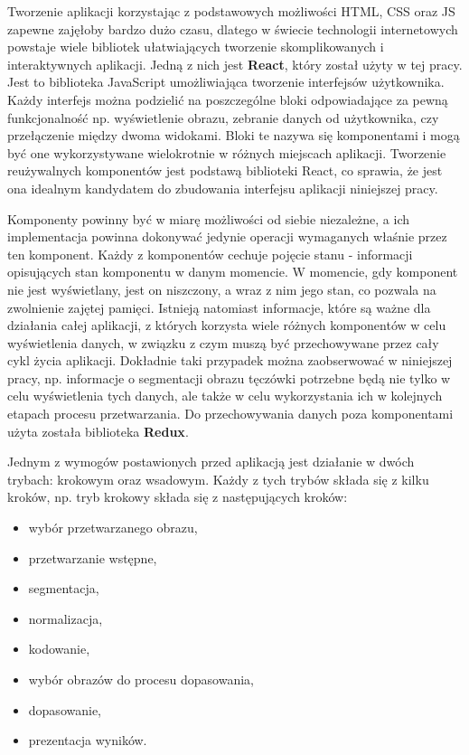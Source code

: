 \documentclass[10pt,polish,a4paper,oneside]{ppfcmthesis}
\begin{document}
Tworzenie aplikacji korzystając z podstawowych możliwości HTML, CSS oraz JS zapewne zajęłoby
bardzo dużo czasu, dlatego w świecie technologii internetowych powstaje wiele bibliotek
ułatwiających tworzenie skomplikowanych i interaktywnych aplikacji. Jedną z nich jest
\textbf{React}, który został użyty w tej pracy. Jest to biblioteka JavaScript umożliwiająca
tworzenie interfejsów użytkownika. Każdy interfejs można podzieli\'c na poszczególne bloki
odpowiadające za pewną funkcjonalnoś\'c np. wyświetlenie obrazu, zebranie danych od użytkownika,
czy przełączenie między dwoma widokami. Bloki te nazywa się komponentami i mogą by\'c one wykorzystywane
wielokrotnie w różnych miejscach aplikacji. Tworzenie reużywalnych komponentów jest podstawą
biblioteki React, co sprawia, że jest ona idealnym kandydatem do zbudowania interfejsu aplikacji
niniejszej pracy.\newline

Komponenty powinny by\'c w miarę możliwości od siebie niezależne, a ich implementacja powinna
dokonywa\'c jedynie operacji wymaganych właśnie przez ten komponent. Każdy z komponentów cechuje
pojęcie stanu - informacji opisujących stan komponentu w danym momencie. W momencie, gdy komponent
nie jest wyświetlany, jest on niszczony, a wraz z nim jego stan, co pozwala na zwolnienie
zajętej pamięci. Istnieją natomiast informacje, które są ważne dla działania całej aplikacji, z których
korzysta wiele różnych komponentów w celu wyświetlenia danych, w związku z czym muszą by\'c przechowywane
przez cały cykl życia aplikacji. Dokładnie taki przypadek można zaobserwowa\'c w niniejszej pracy, np.
informacje o segmentacji obrazu tęczówki potrzebne będą nie tylko w celu wyświetlenia tych danych,
ale także w celu wykorzystania ich w kolejnych etapach procesu przetwarzania. Do przechowywania danych
poza komponentami użyta została biblioteka \textbf{Redux}.

Jednym z wymogów postawionych przed aplikacją jest działanie w dwóch trybach: krokowym oraz wsadowym.
Każdy z tych trybów składa się z kilku kroków, np. tryb krokowy składa się z następujących kroków:

\begin{itemize}
  \item wybór przetwarzanego obrazu,
  \item przetwarzanie wstępne,
  \item segmentacja,
  \item normalizacja,
  \item kodowanie,
  \item wybór obrazów do procesu dopasowania,
  \item dopasowanie,
  \item prezentacja wyników.
\end{itemize}
\end{document}
